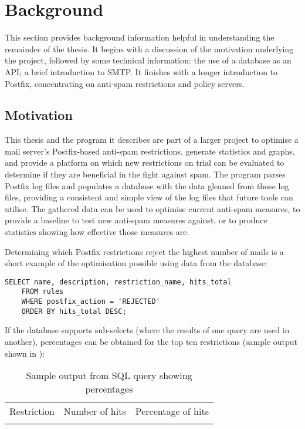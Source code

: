 \chapter{Background}

\label{background}

This section provides background information helpful in understanding the
remainder of the thesis.  It begins with a discussion of the motivation
underlying the project, followed by some technical information: the use of
a database as an \gls{API}\@; a brief introduction to \gls{SMTP}\@.  It
finishes with a longer introduction to Postfix, concentrating on anti-spam
restrictions and policy servers.

\section{Motivation}

\label{motivation}

This thesis and the program it describes are part of a larger project to
optimise a mail server's Postfix-based anti-spam restrictions, generate
statistics and graphs, and provide a platform on which new restrictions on
trial can be evaluated to determine if they are beneficial in the fight
against spam.  The program parses Postfix log files and populates a
database with the data gleaned from those log files, providing a consistent
and simple view of the log files that future tools can utilise.  The
gathered data can be used to optimise current anti-spam measures, to
provide a baseline to test new anti-spam measures against, or to produce
statistics showing how effective those measures are.

Determining which Postfix restrictions reject the highest number of mails
is a short example of the optimisation possible using data from the
database:

\begin{verbatim}
SELECT name, description, restriction_name, hits_total
    FROM rules
    WHERE postfix_action = 'REJECTED'
    ORDER BY hits_total DESC;
\end{verbatim}

If the database supports sub-selects (where the results of one query are
used in another), percentages can be obtained for the top ten restrictions
(sample output shown in ):



\begin{table}[ht]
    \caption{Sample output from SQL query showing percentages}
    \empty{}\label{Sample output from SQL query showing
    percentages}
    \begin{tabular}[]{lrr}
        \tabletopline{}%
        Restriction & Number of hits & Percentage of hits \\
        \tablemiddleline{}%
        
        \tablebottomline{}%
    \end{tabular}
\end{table}


